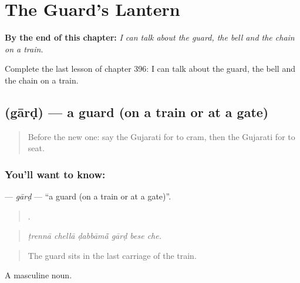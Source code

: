 
\chapter{The Guard's Lantern}
\label{ch:gu-the-guard-s-lantern}

\begin{chapteropening}
\textbf{By the end of this chapter:} \emph{I can talk about the guard, the bell and the chain on a train.}

Complete the last lesson of chapter 396: I can talk about the guard, the bell and the chain on a train.
\end{chapteropening}

\section[\texorpdfstring{\gu{ગાર્ડ} (gārḍ)}{ગાર્ડ (gārḍ)}]{ (gārḍ) — a guard (on a train or at a gate)}

\label{lesson:GU-C396-gard}



\begin{quote}
Before the new one: say the Gujarati for to cram, then the Gujarati for to seat.
\end{quote}

\subsection*{You'll want to know: }
\textbf{} — \emph{gārḍ} — \textquotedblleft{}a guard (on a train or at a gate)\textquotedblright{}.

\begin{quote}
     .
\end{quote}

\begin{quote}
\emph{ṭrennā chellā ḍabbāmā̃ gārḍ bese che.}
\end{quote}

\begin{quote}
The guard sits in the last carriage of the train.
\end{quote}

A masculine noun.

